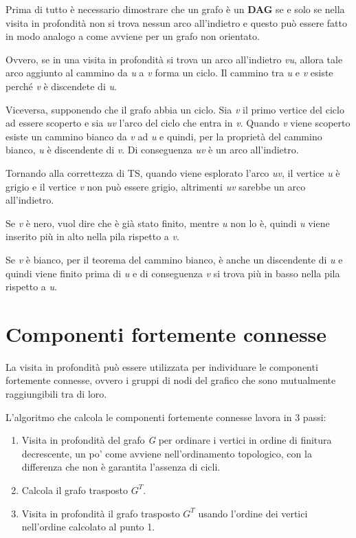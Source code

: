 Prima di tutto è necessario dimostrare che un grafo è un \textbf{DAG} se
e solo se nella visita in profondità non si trova nessun arco
all'indietro e questo può essere fatto in modo analogo a come avviene
per un grafo non orientato.

Ovvero, se in una visita in profondità si trova un arco all'indietro \textit{vu}, 
allora tale arco aggiunto al cammino da \textit{u} a \textit{v} forma un ciclo.
Il cammino tra \textit{u} e \textit{v} esiste perché \textit{v} è discendete di \textit{u}.

Viceversa, supponendo che il grafo abbia un ciclo. 
Sia \textit{v} il primo vertice del ciclo ad essere scoperto e
sia \textit{uv} l’arco del ciclo che entra in \textit{v}.
Quando \textit{v} viene scoperto esiste un cammino bianco da \textit{v} ad \textit{u} e quindi, per la proprietà del cammino bianco, \textit{u} è discendente di \textit{v}.
Di conseguenza \textit{uv} è un arco all’indietro.

Tornando alla correttezza di \textsc{TS}, quando viene esplorato l'arco
\emph{uv}, il vertice \emph{u} è grigio e il vertice \emph{v} non può
essere grigio, altrimenti \emph{uv} sarebbe un arco all'indietro.

Se \emph{v} è nero, vuol dire che è già stato finito, mentre \emph{u}
non lo è, quindi \emph{u} viene inserito più in alto nella pila rispetto
a \emph{v}.

Se \emph{v} è bianco, per il teorema del cammino bianco, è anche un
discendente di \emph{u} e quindi viene finito prima di \emph{u} e di
conseguenza \emph{v} si trova più in basso nella pila rispetto a
\emph{u}.

\section{Componenti fortemente connesse}\label{componenti-fortemente-connesse}

La visita in profondità può essere utilizzata per individuare le
componenti fortemente connesse, ovvero i gruppi di nodi del grafico che
sono mutualmente raggiungibili tra di loro.

L'algoritmo che calcola le componenti fortemente connesse lavora in 3
passi:

\begin{enumerate}
\item
  Visita in profondità del grafo \emph{G} per ordinare i vertici in
  ordine di finitura decrescente, un po' come avviene nell'ordinamento
  topologico, con la differenza che non è garantita l'assenza di cicli.
\item
  Calcola il grafo trasposto $G^T$.
\item
  Visita in profondità il grafo trasposto $G^T$ usando l'ordine
  dei vertici nell'ordine calcolato al punto 1.
\end{enumerate}

